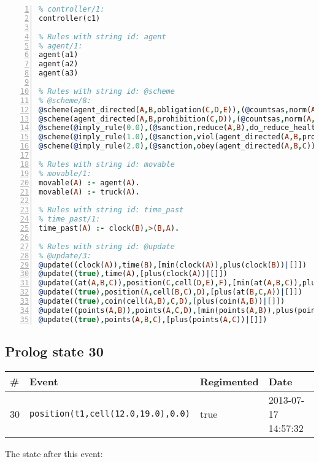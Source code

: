 \documentclass[11pt]{article}\usepackage[utf8]{inputenc}\usepackage{geometry}
\begin{document}
\begin{lstlisting}[language=Prolog, numbers=left]
% Rules with string id: controller
% controller/1:
controller(c1)

% Rules with string id: agent
% agent/1:
agent(a1)
agent(a2)
agent(a3)

% Rules with string id: @scheme
% @scheme/8:
@scheme(agent_directed(A,B,obligation(C,D,E)),(@countsas,norm(A,B,F,obligation(C,D,E)),F),false,(listTrue(C)),(time_past(D)),false,[plus(viol(agent_directed(A,B,obligation(C,D,E))))|[]],[plus(obey(agent_directed(A,B,obligation(C,D,E))))|[]])
@scheme(agent_directed(A,B,prohibition(C,D)),(@countsas,norm(A,B,E,prohibition(C,D)),E),(listTrue(C)),false,(false),false,[plus(viol(agent_directed(A,B,prohibition(C,D))))|[]],[plus(obey(agent_directed(A,B,prohibition(C,D))))|[]])
@scheme(@imply_rule(0.0),(@sanction,reduce(A,B),do_reduce_health(A,B),notifyAgent(A,changed(status))),true,false,false,false,[min(reduce(A,B))|[]],[])
@scheme(@imply_rule(1.0),(@sanction,viol(agent_directed(A,B,prohibition(C,D))),do_sanction(D)),true,false,false,false,[min(viol(agent_directed(A,B,prohibition(C,D))))|[]],[])
@scheme(@imply_rule(2.0),(@sanction,obey(agent_directed(A,B,C))),true,false,false,false,[min(obey(agent_directed(A,B,C)))|[]],[])

% Rules with string id: movable
% movable/1:
movable(A) :- agent(A).
movable(A) :- truck(A).

% Rules with string id: time_past
% time_past/1:
time_past(A) :- clock(B),>(B,A).

% Rules with string id: @update
% @update/3:
@update((clock(A)),time(B),[min(clock(A)),plus(clock(B))|[]])
@update((true),time(A),[plus(clock(A))|[]])
@update((at(A,B,C)),position(C,cell(D,E),F),[min(at(A,B,C)),plus(at(D,E,C))|[]])
@update((true),position(A,cell(B,C),D),[plus(at(B,C,A))|[]])
@update((true),coin(cell(A,B),C,D),[plus(coin(A,B))|[]])
@update((points(A,B)),points(A,C,D),[min(points(A,B)),plus(points(A,D))|[]])
@update((true),points(A,B,C),[plus(points(A,C))|[]])

\end{lstlisting}
\clearpage 
\subsection{Prolog state 30}
\begin{table}[ht]
\centering 
\begin{tabular}{l l l l} 
\textbf{\#} & \textbf{Event} & \textbf{Regimented} & \textbf{Date} \\ [0.5ex] 
\hline
30&\texttt{position(t1,cell(12.0,19.0),0.0)}&true&2013-07-17 14:57:32\\ [1ex] \hline\end{tabular}
\end{table}
The state after this event:
\end{document}
